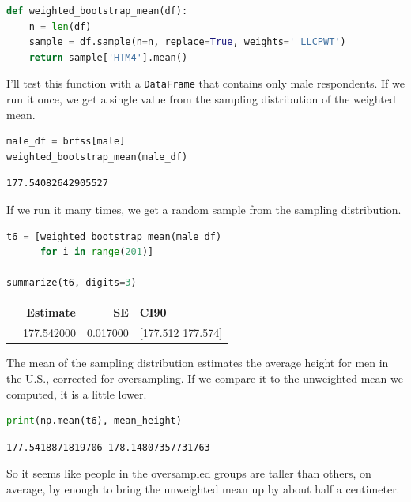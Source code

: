 \begin{lstlisting}[language=Python,style=source]
def weighted_bootstrap_mean(df):
    n = len(df)
    sample = df.sample(n=n, replace=True, weights='_LLCPWT')
    return sample['HTM4'].mean()
\end{lstlisting}

I'll test this function with a \passthrough{\lstinline!DataFrame!} that
contains only male respondents. If we run it once, we get a single value
from the sampling distribution of the weighted mean.

\begin{lstlisting}[language=Python,style=source]
male_df = brfss[male]
weighted_bootstrap_mean(male_df)
\end{lstlisting}

\begin{lstlisting}[style=output]
177.54082642905527
\end{lstlisting}

If we run it many times, we get a random sample from the sampling
distribution.

\begin{lstlisting}[language=Python,style=source]
t6 = [weighted_bootstrap_mean(male_df) 
      for i in range(201)]

summarize(t6, digits=3)
\end{lstlisting}

\begin{tabular}{lrrl}
\midrule
 & Estimate & SE & CI90 \\
\midrule
 & 177.542000 & 0.017000 & [177.512 177.574] \\
\midrule
\end{tabular}

The mean of the sampling distribution estimates the average height for
men in the U.S., corrected for oversampling. If we compare it to the
unweighted mean we computed, it is a little lower.

\begin{lstlisting}[language=Python,style=source]
print(np.mean(t6), mean_height)
\end{lstlisting}

\begin{lstlisting}[style=output]
177.5418871819706 178.14807357731763
\end{lstlisting}

So it seems like people in the oversampled groups are taller than
others, on average, by enough to bring the unweighted mean up by about
half a centimeter.

